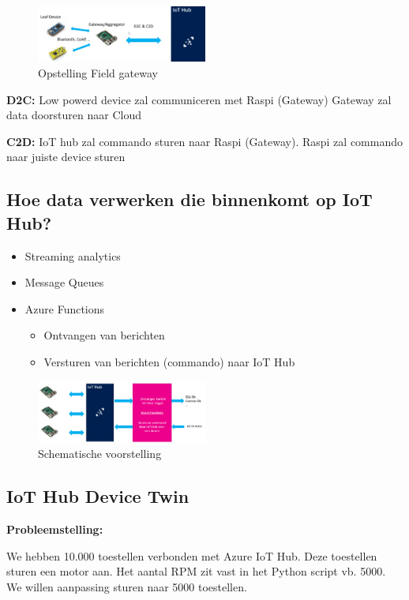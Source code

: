 \documentclass{article}
\newcommand{\bold}[1]{\textbf{#1}}
\begin{document}
\begin{figure}[H]
    \centering
    \includegraphics[width=0.5\textwidth]{iot-leaf.png}
    \caption{Opstelling Field gateway}
\end{figure}

\bold{D2C:} Low powerd device zal communiceren met Raspi (Gateway)
Gateway zal data doorsturen naar Cloud

\bold{C2D:} IoT hub zal commando sturen naar Raspi (Gateway). Raspi zal commando
naar juiste device sturen

\subsection{Hoe data verwerken die binnenkomt op IoT Hub?}


\begin{itemize}
    \item Streaming analytics
    \item Message Queues
    \item Azure Functions
    \begin{itemize}
        \item Ontvangen van berichten
        \item Versturen van berichten (commando) naar IoT Hub
    \end{itemize}
\end{itemize}

\begin{figure}[H]
    \centering
    \includegraphics[width=0.5\textwidth]{iot-hub-trigger.png}
    \caption{Schematische voorstelling}
\end{figure}


\subsection{IoT Hub Device Twin}

\bold{Probleemstelling:} 

We hebben 10.000 toestellen verbonden met Azure IoT Hub. Deze toestellen sturen een
motor aan. Het aantal RPM zit vast in het Python script vb. 5000.
We willen aanpassing sturen naar 5000 toestellen.
\end{document}
